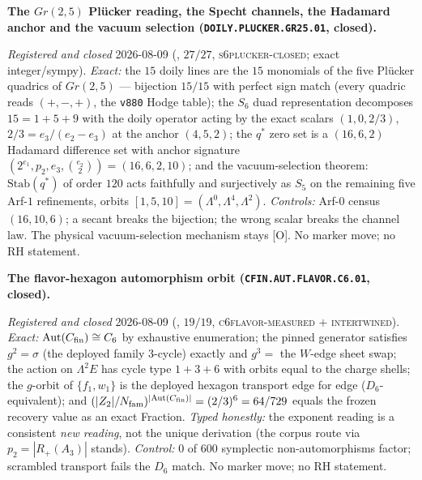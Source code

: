 \documentclass[11pt,a4paper]{article}
\newcommand{\Nfam}{N_{\mathrm{fam}}}
\begin{document}
\par\smallskip\noindent\textbf{The $Gr(2,5)$ Pl\"ucker reading,
the Specht channels, the Hadamard anchor and the vacuum
selection (\texttt{DOILY.PLUCKER.\allowbreak GR25.01},
closed).}
{\sloppy
\emph{Registered and closed} 2026-08-09
(, $27/27$,
\textsc{s6plucker-closed}; exact integer/sympy).  \emph{Exact:}
the $15$ doily lines are the $15$ monomials of the five
Pl\"ucker quadrics of $Gr(2,5)$ --- bijection $15/15$ with
perfect sign match (every quadric reads $(+,-,+)$, the
\texttt{v880} Hodge table); the $S_6$ duad representation
decomposes $15 = 1 + 5 + 9$ with the doily operator acting by
the exact scalars $(1, 0, 2/3)$, $2/3 = e_3/(e_2 - e_3)$ at the
anchor $(4, 5, 2)$; the $q^{*}$ zero set is a $(16, 6, 2)$
Hadamard difference set with anchor signature $(2^{e_1}, p_2,
e_3, \binom{e_2}{2}) = (16, 6, 2, 10)$; and the
vacuum-selection theorem: $\mathrm{Stab}(q^{*})$ of order $120$
acts faithfully and surjectively as $S_5$ on the remaining five
Arf-$1$ refinements, orbits $[1, 5, 10] = (\Lambda^0,
\Lambda^4, \Lambda^2)$.  \emph{Controls:} Arf-$0$ census
$(16,10,6)$; a secant breaks the bijection; the wrong scalar
breaks the channel law.  The physical vacuum-selection
mechanism stays [O].  No marker move; no RH statement.\par}

\par\smallskip\noindent\textbf{The flavor-hexagon automorphism
orbit (\texttt{CFIN.AUT.\allowbreak FLAVOR.C6.01}, closed).}
{\sloppy
\emph{Registered and closed} 2026-08-09
(, $19/19$,
\textsc{c6flavor-measured} $+$ \textsc{intertwined}).
\emph{Exact:} $\mathrm{Aut}(C_{\rm fin}) \cong C_6$ by
exhaustive enumeration; the pinned generator satisfies $g^2 =
\sigma$ (the deployed family $3$-cycle) exactly and $g^3 =$ the
$W$-edge sheet swap; the action on $\Lambda^2 E$ has cycle type
$1 + 3 + 6$ with orbits equal to the charge shells; the
$g$-orbit of $\{f_1, w_1\}$ is the deployed hexagon transport
edge for edge ($D_6$-equivalent); and $(|Z_2|/\Nfam)^{|
\mathrm{Aut}(C_{\rm fin})|} = (2/3)^6 = 64/729$ equals the
frozen recovery value as an exact Fraction.  \emph{Typed
honestly:} the exponent reading is a consistent \emph{new
reading}, not the unique derivation (the corpus route via $p_2
= |R_+(A_3)|$ stands).  \emph{Control:} $0$ of $600$ symplectic
non-automorphisms factor; scrambled transport fails the $D_6$
match.  No marker move; no RH statement.\par}
\end{document}

